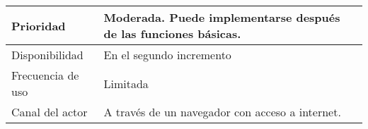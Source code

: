 \begin{table}[htpb]
\begin{tabularx}{\textwidth}{|X|X|}
Prioridad                         & Moderada. Puede implementarse después de las funciones básicas.                                                                                                                                                                                                                                                                                                                                                                                                                                                                                                                                                 \\ \hline
Disponibilidad                    & En el segundo incremento                                                                                                                                                                                                                                                                                                                                                                                                                                                                                                                                                                                        \\ \hline
Frecuencia de uso                 & Limitada                                                                                                                                                                                                                                                                                                                                                                                                                                                                                                                                                                                                        \\ \hline
Canal del actor                   & A través de un navegador con acceso a internet.                                                                                                                                                                                                                                                                                                                                                                                                                                                                                                                                                                 \\ \hline

\end{tabularx}
\end{table}
